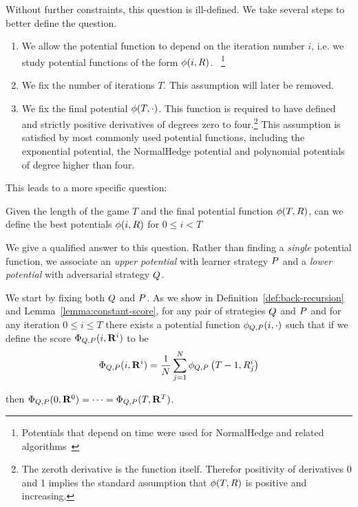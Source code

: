 \documentclass[12pt]{article} %
\begin{document}
Without further constraints, this question is ill-defined. We take
several steps to better define the question.
\begin{enumerate}
\item We allow the potential function to depend on the
  iteration number $i$, i.e. we study potential functions of the form
  $\phi(i,R)$. ~\footnote{Potentials that depend on time were used
    for NormalHedge and related
    algorithms~\cite{chaudhuri2009parameter,luo2015achieving}}
\item We fix the number of iterations $T$. This assumption will later be removed.
\item We fix the final potential $\phi(T,\cdot)$. This function
  is required to have defined and
  strictly positive derivatives of degrees zero to four.\footnote{The zeroth derivative
    is the function itself. Therefor positivity of derivatives 0 and
    1 implies the standard assumption
  that $\phi(T,R)$ is positive and increasing.} This  
assumption is satisfied by most commonly used potential functions,
including the exponential potential, the
NormalHedge potential and polynomial potentials of degree higher than four.
\end{enumerate}
This leads to a more specific question:
\begin{question} \label{ques:goodStrategies}
  Given the length of the game $T$ and the final potential function
  $\phi(T,R)$, can we define the best potentials $\phi(i,R)$ for
  $0 \leq i < T$
\end{question}

We give a qualified answer to this question. Rather than finding a {\em
  single} potential function, we associate an {\em upper
  potential} with learner strategy $P$ and a {\em lower potential}
with adversarial strategy $Q$.

We start by fixing both $Q$ and $P$. As we show in Definition~\ref{def:back-recursion} and
Lemma~\ref{lemma:constant-score}, for any pair of strategies 
$Q$ and $P$  and for any iteration $0\leq i \leq T$ there exists a potential function
$\phi_{Q,P}(i,\cdot)$ such that if we define the score
$\Phi_{Q,P}(i,\mathbf{R}^{i})$ to be 
\begin{equation} \label{eqn:potential}
  \Phi_{Q,P}(i,\mathbf{R}^i) = \frac{1}{N} \sum_{j=1}^N \phi_{Q,P} \left(T-1,R_j^{i} \right)
\end{equation}

then $\Phi_{Q,P}(0,\mathbf{R}^0)=\cdots = \Phi_{Q,P}(T,\mathbf{R}^T)$.
\end{document}
